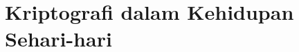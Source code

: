 \documentclass[../main.tex]{subfiles}
\begin{document}
\chapter{Kriptografi dalam Kehidupan Sehari-hari}
\end{document}
